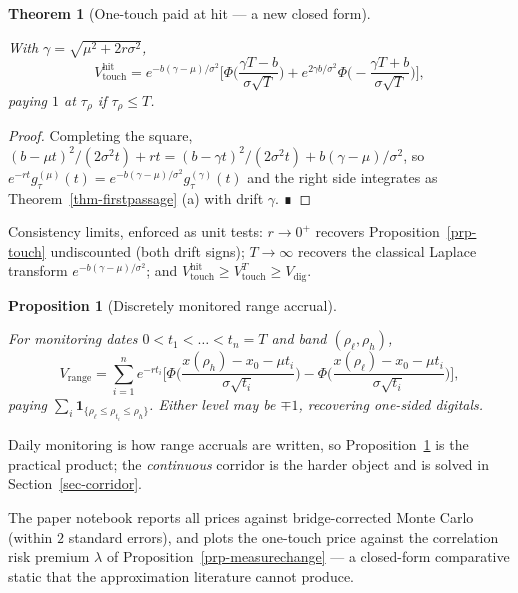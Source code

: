 \documentclass[
  english,
  10pt,
  letterpaper,
  DIV=11,
  numbers=noendperiod]{scrartcl}
\theoremstyle{plain}
\newtheorem{theorem}{Theorem}[section]
\theoremstyle{plain}
\newtheorem{proposition}{Proposition}[section]
\theoremstyle{plain}
\theoremstyle{plain}
\theoremstyle{definition}
\theoremstyle{remark}
\begin{document}
\begin{theorem}[One-touch paid at hit --- a new closed
form]\protect\hypertarget{thm-touchhit}{}\label{thm-touchhit}

With \(\gamma=\sqrt{\mu^{2}+2r\sigma^{2}}\), \[
V_{\mathrm{touch}}^{\mathrm{hit}}
=
e^{-b(\gamma-\mu)/\sigma^{2}}
\Big[
\Phi\!\Big(\frac{\gamma T-b}{\sigma\sqrt T}\Big)
+
e^{2\gamma b/\sigma^{2}}
\Phi\!\Big(-\frac{\gamma T+b}{\sigma\sqrt T}\Big)
\Big],
\] paying \(1\) at \(\tau_\rho\) if \(\tau_\rho\le T\).

\end{theorem}

\begin{proof}
Completing the square,
\((b-\mu t)^{2}/(2\sigma^{2}t)+rt=(b-\gamma t)^{2}/(2\sigma^{2}t)
+b(\gamma-\mu)/\sigma^{2}\), so
\(e^{-rt}g_\tau^{(\mu)}(t)=e^{-b(\gamma-\mu)/\sigma^{2}}g_\tau^{(\gamma)}(t)\)
and the right side integrates as Theorem~\ref{thm-firstpassage} (a) with
drift \(\gamma\). ∎
\end{proof}

Consistency limits, enforced as unit tests: \(r\to0^{+}\) recovers
Proposition~\ref{prp-touch} undiscounted (both drift signs);
\(T\to\infty\) recovers the classical Laplace transform
\(e^{-b(\gamma-\mu)/\sigma^{2}}\); and
\(V_{\mathrm{touch}}^{\mathrm{hit}}\ge V_{\mathrm{touch}}^{T}\ge
V_{\mathrm{dig}}\).

\begin{proposition}[Discretely monitored range
accrual]\protect\hypertarget{prp-accrual}{}\label{prp-accrual}

For monitoring dates \(0<t_1<\dots<t_n=T\) and band
\((\rho_\ell,\rho_h)\), \[
V_{\mathrm{range}}
=
\sum_{i=1}^{n}e^{-rt_i}
\Big[
\Phi\!\Big(\frac{x(\rho_h)-x_0-\mu t_i}{\sigma\sqrt{t_i}}\Big)
-
\Phi\!\Big(\frac{x(\rho_\ell)-x_0-\mu t_i}{\sigma\sqrt{t_i}}\Big)
\Big],
\] paying \(\sum_i\mathbf 1_{\{\rho_\ell\le\rho_{t_i}\le\rho_h\}}\).
Either level may be \(\mp1\), recovering one-sided digitals.

\end{proposition}

Daily monitoring is how range accruals are written, so
Proposition~\ref{prp-accrual} is the practical product; the
\emph{continuous} corridor is the harder object and is solved in
Section~\ref{sec-corridor}.

The paper notebook reports all prices against bridge-corrected Monte
Carlo (within \(2\) standard errors), and plots the one-touch price
against the correlation risk premium \(\lambda\) of
Proposition~\ref{prp-measurechange} --- a closed-form comparative static
that the approximation literature cannot produce.
\end{document}
